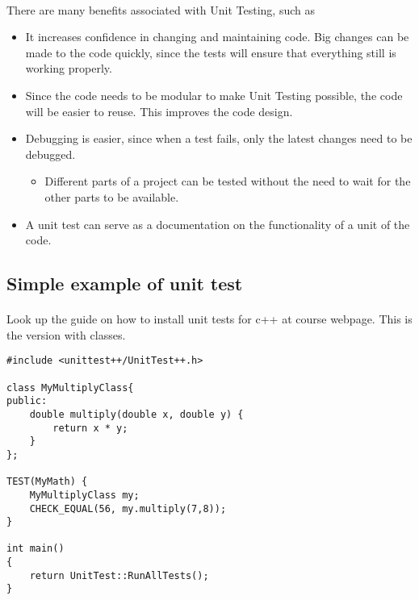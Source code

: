 \documentclass[%
oneside,                 %
final,                   %
10pt]{article}
\begin{document}
\paragraph{}
There are many benefits associated with Unit Testing, such as
\begin{itemize}
  \item It increases confidence in changing and maintaining code. Big changes can be made to the code quickly, since the tests will ensure that everything still is working properly.

  \item Since the code needs to be modular to make Unit Testing possible, the code will be easier to reuse. This improves the code design.

  \item Debugging is easier, since when a test fails, only the latest changes need to be debugged.
\begin{itemize}

   \item Different parts of a project can be tested without the need to wait for the other parts to be available.

\end{itemize}

\noindent
  \item A unit test can serve as a documentation on the functionality of a unit of the code.
\end{itemize}

\noindent




\subsection*{Simple example of unit test}

\paragraph{}
Look up the guide on how to install unit tests for c++ at course webpage. This is the version with classes.
\begin{verbatim}
#include <unittest++/UnitTest++.h>

class MyMultiplyClass{
public:
    double multiply(double x, double y) {
        return x * y;
    }
};

TEST(MyMath) {
    MyMultiplyClass my;
    CHECK_EQUAL(56, my.multiply(7,8));
}

int main()
{
    return UnitTest::RunAllTests();
}
\end{verbatim}
\end{document}
